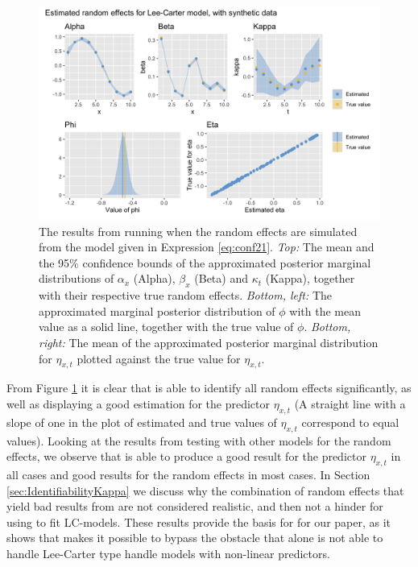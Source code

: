 \begin{figure}[h!]
    \centering
    \includegraphics[width=0.85\linewidth]{synthetic-data/Figures/effects-LC-synthetic.png}
    \caption{The results from running \inlabru when the random effects are simulated from the model given in Expression \ref{eq:conf21}. \textit{Top:} The mean and the 95\% confidence bounds of the approximated posterior marginal distributions of $\alpha_x$ (Alpha), $\beta_x$ (Beta) and $\kappa_t$ (Kappa), together with their respective true random effects. \textit{Bottom, left:} The approximated marginal posterior distribution of $\phi$ with the mean value as a solid line, together with the true value of $\phi$. \textit{Bottom, right:} The mean of the approximated posterior marginal distribution for $\eta_{x,t}$ plotted against the true value for $\eta_{x,t}$. }
    \label{fig:firstRun}
\end{figure}
From Figure \ref{fig:firstRun} it is clear that \inlabru is able to identify all random effects significantly, as well as displaying a good estimation for the predictor $\eta_{x,t}$ (A straight line with a slope of one in the plot of estimated and true values of $\eta_{x,t}$ correspond to equal values). Looking at the results from testing \inlabru with other models for the random effects, we observe that \inlabru is able to produce a good result for the predictor $\eta_{x,t}$ in all cases and good results for the random effects in most cases. In Section \ref{sec:IdentifiabilityKappa} we discuss why the combination of random effects that yield bad results from \inlabru are not considered realistic, and then not a hinder for using \inlabru to fit LC-models. These results provide the basis for for our paper, as it shows that \inlabru makes it possible to bypass the obstacle that \inla alone is not able to handle Lee-Carter type handle models with non-linear predictors.

